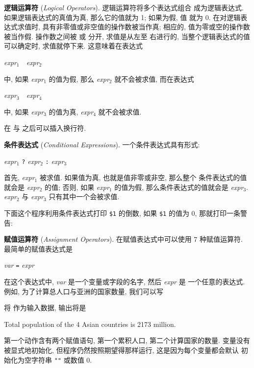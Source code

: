 \textbf{逻辑运算符} (\emph{Logical Operators}). 逻辑运算符将多个表达式组合
成为逻辑表达式. 如果逻辑表达式的真值为真, 那么它的值就为 1; 如果为假, 值
就为 0. 在对逻辑表达式求值时, 具有非零值或非空值的操作数被当作真; 相应的,
值为零或空的操作数被当作假. 操作数之间被 \AND  或 \OR 分开, 求值是从左至
右进行的, 当整个逻辑表达式的值可以确定时, 求值就停下来. 这意味着在表达式
\begin{pattern}
    \textit{expr}$_1$\ \AND\ \textit{expr}$_2$
\end{pattern}
中, 如果 \textit{expr}$_1$ 的值为假, 那么 \textit{expr}$_2$ 就不会被求值,
而在表达式
\begin{pattern}
    \textit{expr}$_3$\ \OR\ \textit{expr}$_4$
\end{pattern}
中, 如果 \textit{expr}$_3$  的值为真, \textit{expr}$_4$ 就不会被求值.

在 \AND  与 \OR 之后可以插入换行符.

\textbf{条件表达式} (\emph{Conditional Expressions}). 一个条件表达式具有形式:
\begin{pattern}
    \textit{expr}$_1$ \verb'?' \textit{expr}$_2$ \verb':' \textit{expr}$_3$
\end{pattern}
首先, \textit{expr}$_1$ 被求值. 如果值为真, 也就是值非零或非空, 那么整个
条件表达式的值就会是 \textit{expr}$_2$ 的值; 否则, 如果 \textit{expr}$_1$
的值为假, 那么条件表达式的值就会是 \textit{expr}$_3$. \textit{expr}$_2$ 与
\textit{expr}$_3$ 只有其中一个会被求值.

下面这个程序利用条件表达式打印 \verb'$1' 的倒数, 如果 \verb'$1' 的值为 0,
那就打印一条警告:

\textbf{赋值运算符} (\emph{Assignment Operators}). 在赋值表达式中可以使用 7
种赋值运算符. 最简单的赋值表达式是
\begin{pattern}
    \textit{var} \verb'=' \textit{expr}
\end{pattern}
在这个表达式中, \textit{var} 是一个变量或字段的名字, 然后 \textit{expr} 是
一个任意的表达式. 例如, 为了计算总人口与亚洲的国家数量, 我们可以写
将  作为输入数据, 输出将是
\begin{awkcode}
    Total population of the 4 Asian countries is 2173 million.
\end{awkcode}
第一个动作含有两个赋值语句, 第一个累积人口, 第二个计算国家的数量. 变量没有
被显式地初始化, 但程序仍然按照期望得那样运行, 这是因为每个变量都会默认
初始化为空字符串 \verb'""' 或数值 0.

